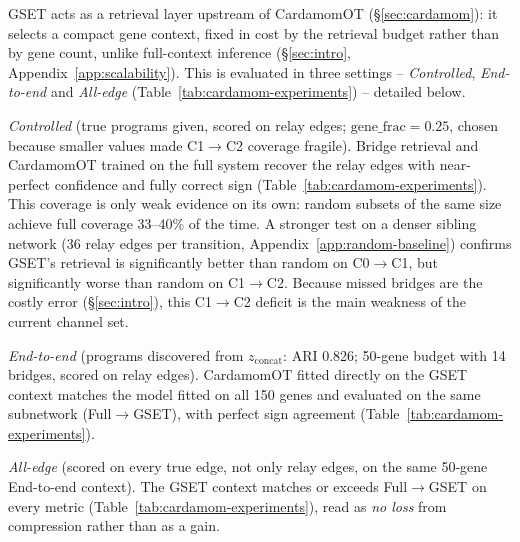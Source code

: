 \documentclass[10pt, letterpaper]{article}
\DeclareRobustCommand{\eliasadds}[1]{{\color{red}#1}}
\begin{document}
GSET acts as a retrieval layer upstream of CardamomOT (\S\ref{sec:cardamom}): it selects a compact gene context, fixed in cost by the retrieval budget rather than by gene count, unlike full-context inference (\S\ref{sec:intro}, Appendix~\ref{app:scalability}). This is evaluated in three settings -- \emph{Controlled}, \emph{End-to-end} and \emph{All-edge} (Table~\ref{tab:cardamom-experiments}) -- detailed below.


\emph{Controlled} (true programs given, scored on relay edges; $\mathrm{gene\_frac}=0.25$, chosen because smaller values made C1$\to$C2 coverage fragile). Bridge retrieval and CardamomOT trained on the full system recover the relay edges with near-perfect confidence and fully correct sign (Table~\ref{tab:cardamom-experiments}). This coverage is only weak evidence on its own: random subsets of the same size achieve full coverage 33--40\% of the time. A stronger test on a denser sibling network (36 relay edges per transition, Appendix~\ref{app:random-baseline}) confirms GSET's retrieval is significantly better than random on C0$\to$C1, but significantly worse than random on C1$\to$C2. \eliasadds{Because missed bridges are the costly error (\S\ref{sec:intro}), this C1$\to$C2 deficit is the main weakness of the current channel set.}

\emph{End-to-end} (programs discovered from $z_{\mathrm{concat}}$: ARI 0.826; 50-gene budget with 14 bridges, scored on relay edges). CardamomOT fitted directly on the GSET context matches the model fitted on all 150 genes and evaluated on the same subnetwork (Full$\to$GSET), with perfect sign agreement (Table~\ref{tab:cardamom-experiments}).

\emph{All-edge} (scored on every true edge, not only relay edges, on the same 50-gene End-to-end context). The GSET context matches or exceeds Full$\to$GSET on every metric (Table~\ref{tab:cardamom-experiments}), read as \emph{no loss} from compression rather than as a gain.
\end{document}
